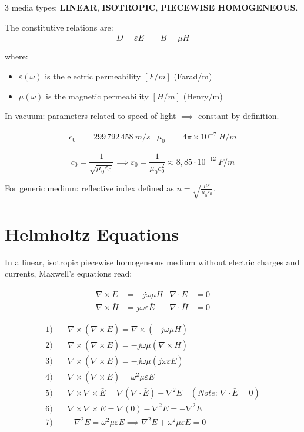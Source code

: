 3 media types: \textbf{LINEAR}, \textbf{ISOTROPIC}, \textbf{PIECEWISE HOMOGENEOUS}.

The constitutive relations are:
\begin{equation*}
\bar{D} = \varepsilon \bar{E} \quad \quad \bar{B} = \mu \bar{H}
\end{equation*}

where:
\begin{itemize}
    \item $\varepsilon(\omega)$ is the electric permeability $[F/m]$ (Farad/m)
    \item $\mu(\omega)$ is the magnetic permeability $[H/m]$ (Henry/m)
\end{itemize}


In vacuum: parameters related to speed of light $\implies$ constant by definition.

\begin{align*}
c_0 &= 299\,792\,458 \ m/s & \mu_0 &= 4\pi \times 10^{-7} \ H/m
\end{align*}

\begin{equation*}
c_0 = \frac{1}{\sqrt{\mu_0 \varepsilon_0}} \implies \varepsilon_0 = \frac{1}{\mu_0 c_0^2} \approx 8,85 \cdot 10^{-12} \ F/m
\end{equation*}

For generic medium: reflective index defined as $n = \sqrt{\frac{\mu \varepsilon}{\mu_0 \varepsilon_0}}$.

\section{Helmholtz Equations}

In a linear, isotropic piecewise homogeneous medium without electric charges and currents, Maxwell's equations read:

\begin{align*}
\nabla \times \bar{E} &= -j\omega \mu \bar{H} & \nabla \cdot \bar{E} &= 0 \\[1em]
\nabla \times \bar{H} &= j\omega \varepsilon \bar{E} & \nabla \cdot \bar{H} &= 0
\end{align*}

\begin{align*}
1) \quad & \nabla \times (\nabla \times \bar{E}) = \nabla \times (-j\omega \mu \bar{H}) \\
2) \quad & \nabla \times (\nabla \times \bar{E}) = -j\omega \mu (\nabla \times \bar{H}) \\
3) \quad & \nabla \times (\nabla \times \bar{E}) = -j\omega \mu (j\omega \varepsilon \bar{E}) \\
4) \quad & \nabla \times (\nabla \times \bar{E}) = \omega^2 \mu \varepsilon \bar{E} \\
5) \quad & \nabla \times \nabla \times \bar{E} = \nabla(\nabla \cdot \bar{E}) - \nabla^2 E \quad (\textit{Note: } \nabla \cdot \bar{E} = 0) \\
6) \quad & \nabla \times \nabla \times \bar{E} = \nabla(0) - \nabla^2 E = - \nabla^2 E \\
7) \quad & -\nabla^2 E = \omega^2 \mu \varepsilon E \implies \nabla^2 E + \omega^2 \mu \varepsilon E = 0
\end{align*}

